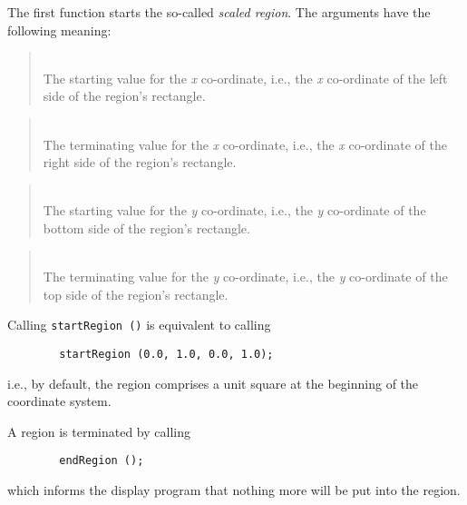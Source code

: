 The first function starts the so-called {\em scaled region}.
The arguments have the following meaning:

\medskip

\begin{quote}
\noindent{}\\ \hspace{0in}
The starting value for the {\em x\/} co-ordinate, i.e., the {\em x\/} co-ordinate of the
left side of the region's rectangle.
\end{quote}

\begin{quote}
\noindent{}\\ \hspace{0in}
The terminating value for the {\em x\/} co-ordinate, i.e., the {\em x\/} co-ordinate of the
right side of the region's rectangle.
\end{quote}

\begin{quote}
\noindent{}\\ \hspace{0in}
The starting value for the {\em y\/} co-ordinate, i.e., the {\em y\/} co-ordinate of the
bottom side of the region's rectangle.
\end{quote}

\begin{quote}
\noindent{}\\ \hspace{0in}
The terminating value for the {\em y\/} co-ordinate, i.e., the {\em y\/} co-ordinate of the
top side of the region's rectangle.
\end{quote}\medskip

Calling {\tt startRegion~()} is equivalent to calling
\begin{verbatim}
        startRegion (0.0, 1.0, 0.0, 1.0);
\end{verbatim}
i.e., by default,
the region comprises a unit square at the beginning of the coordinate
system.

A region is terminated by calling
\begin{verbatim}
        endRegion ();
\end{verbatim}
which informs the display program that nothing more will be put into
the region.

